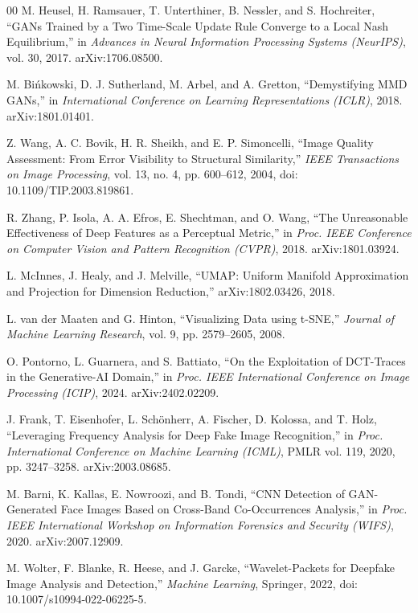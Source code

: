 \documentclass[journal]{IEEEtran}
\begin{document}
\begin{thebibliography}{00}
M. Heusel, H. Ramsauer, T. Unterthiner, B. Nessler, and S. Hochreiter,
``GANs Trained by a Two Time-Scale Update Rule Converge to a Local Nash Equilibrium,''
in \textit{Advances in Neural Information Processing Systems (NeurIPS)}, vol. 30, 2017.
arXiv:1706.08500.

M. Bi\'nkowski, D. J. Sutherland, M. Arbel, and A. Gretton,
``Demystifying MMD GANs,''
in \textit{International Conference on Learning Representations (ICLR)}, 2018.
arXiv:1801.01401.

Z. Wang, A. C. Bovik, H. R. Sheikh, and E. P. Simoncelli,
``Image Quality Assessment: From Error Visibility to Structural Similarity,''
\textit{IEEE Transactions on Image Processing}, vol. 13, no. 4, pp. 600--612, 2004,
doi: 10.1109/TIP.2003.819861.

R. Zhang, P. Isola, A. A. Efros, E. Shechtman, and O. Wang,
``The Unreasonable Effectiveness of Deep Features as a Perceptual Metric,''
in \textit{Proc. IEEE Conference on Computer Vision and Pattern Recognition (CVPR)}, 2018.
arXiv:1801.03924.

L. McInnes, J. Healy, and J. Melville,
``UMAP: Uniform Manifold Approximation and Projection for Dimension Reduction,''
arXiv:1802.03426, 2018.

L. van der Maaten and G. Hinton,
``Visualizing Data using t-SNE,''
\textit{Journal of Machine Learning Research}, vol. 9, pp. 2579--2605, 2008.

O. Pontorno, L. Guarnera, and S. Battiato,
``On the Exploitation of DCT-Traces in the Generative-AI Domain,''
in \textit{Proc. IEEE International Conference on Image Processing (ICIP)}, 2024.
arXiv:2402.02209.

J. Frank, T. Eisenhofer, L. Schönherr, A. Fischer, D. Kolossa, and T. Holz,
``Leveraging Frequency Analysis for Deep Fake Image Recognition,''
in \textit{Proc. International Conference on Machine Learning (ICML)}, PMLR vol. 119, 2020, pp. 3247--3258.
arXiv:2003.08685.

M. Barni, K. Kallas, E. Nowroozi, and B. Tondi,
``CNN Detection of GAN-Generated Face Images Based on Cross-Band Co-Occurrences Analysis,''
in \textit{Proc. IEEE International Workshop on Information Forensics and Security (WIFS)}, 2020.
arXiv:2007.12909.

M. Wolter, F. Blanke, R. Heese, and J. Garcke,
``Wavelet-Packets for Deepfake Image Analysis and Detection,''
\textit{Machine Learning}, Springer, 2022,
doi: 10.1007/s10994-022-06225-5.


\end{thebibliography}
\end{document}
